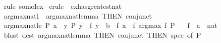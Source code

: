 \begin{isabellebody}
\isamarkupfalse%
\ {\isacharparenleft}{\kern0pt}rule\ someI{\isacharunderscore}{\kern0pt}ex{\isacharparenright}{\kern0pt}\isanewline
{}\isamarkupfalse%
\ {\isacharparenleft}{\kern0pt}erule\ {\isacharparenleft}{\kern0pt}{}{\isacharparenright}{\kern0pt}\ ex{\isacharunderscore}{\kern0pt}has{\isacharunderscore}{\kern0pt}greatest{\isacharunderscore}{\kern0pt}nat{\isacharparenright}{\kern0pt}\isanewline
{}\isamarkupfalse%
%
\endisatagproof
{\isafoldproof}%
%
\isadelimproof
\isanewline
%
\endisadelimproof
\isanewline
{}\isamarkupfalse%
\ arg{\isacharunderscore}{\kern0pt}max{\isacharunderscore}{\kern0pt}natI\ {\isacharequal}{\kern0pt}\ arg{\isacharunderscore}{\kern0pt}max{\isacharunderscore}{\kern0pt}nat{\isacharunderscore}{\kern0pt}lemma\ {\isacharbrackleft}{\kern0pt}THEN\ conjunct{}{\isacharbrackright}{\kern0pt}\isanewline
\isanewline
{}\isamarkupfalse%
\ arg{\isacharunderscore}{\kern0pt}max{\isacharunderscore}{\kern0pt}nat{\isacharunderscore}{\kern0pt}le{\isacharcolon}{\kern0pt}\ {\isachardoublequoteopen}P\ x\ {\isasymLongrightarrow}\ {\isasymforall}y{\isachardot}{\kern0pt}\ P\ y\ {\isasymlongrightarrow}\ f\ y\ {\isacharless}{\kern0pt}\ b\ {\isasymLongrightarrow}\ f\ x\ {\isasymle}\ f\ {\isacharparenleft}{\kern0pt}arg{\isacharunderscore}{\kern0pt}max\ f\ P{\isacharparenright}{\kern0pt}{\isachardoublequoteclose}\isanewline
\ \ \ f\ {\isacharcolon}{\kern0pt}{\isacharcolon}{\kern0pt}\ {\isachardoublequoteopen}{\isacharprime}{\kern0pt}a\ {\isasymRightarrow}\ nat{\isachardoublequoteclose}\isanewline
%
\isadelimproof
%
\endisadelimproof
%
\isatagproof
{}\isamarkupfalse%
\ {\isacharparenleft}{\kern0pt}blast\ dest{\isacharcolon}{\kern0pt}\ arg{\isacharunderscore}{\kern0pt}max{\isacharunderscore}{\kern0pt}nat{\isacharunderscore}{\kern0pt}lemma\ {\isacharbrackleft}{\kern0pt}THEN\ conjunct{}{\isacharcomma}{\kern0pt}\ THEN\ spec{\isacharcomma}{\kern0pt}\ of\ P{\isacharbrackright}{\kern0pt}{\isacharparenright}{\kern0pt}%
\endisatagproof
{\isafoldproof}%
%
\isadelimproof
\isanewline
%
\endisadelimproof
%
\isadelimtheory
\isanewline
%
\endisadelimtheory
%
\isatagtheory
{}\isamarkupfalse%
%
\endisatagtheory
{\isafoldtheory}%
%
\isadelimtheory
%
\endisadelimtheory
%
\end{isabellebody}%
\endinput
